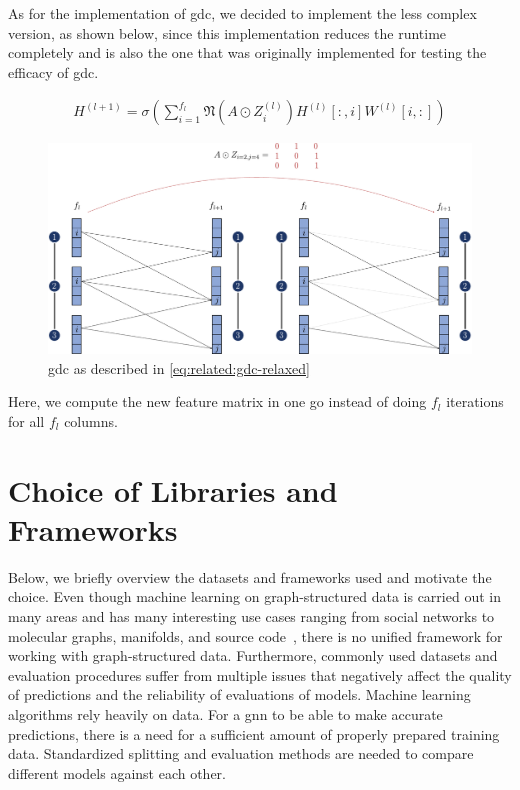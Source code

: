 As for the implementation of \ac{gdc}, we decided to implement the less complex version, as shown below, since this implementation reduces the runtime completely and is also the one that was originally implemented for testing the efficacy of \ac{gdc}.

\begin{align}
    H^{(l+1)} = \sigma(\sum_{i= 1}^{f_{l}}\mathfrak{N}(A \odot Z_{i}^{(l)})H^{(l)}[:,i] W^{(l)}[i,:]) \label{eq:relaxed}
\end{align}
\begin{figure}[ht]
    \centering
    \includegraphics[width= 0.90\linewidth]{gfx/implementation/GDC-eq4.pdf}
    \caption{\Ac{gdc} as described in \cref{eq:related:gdc-relaxed}}\label{fig:implementaion:GDC-eq4}
\end{figure}
Here, we compute the new feature matrix in one go instead of doing $f_{l}$ iterations for all $f_{l}$ columns.


\section{Choice of Libraries and Frameworks}
\label{sec:implement:frameworks}
Below, we briefly overview the datasets and frameworks used and motivate the choice.
Even though machine learning on graph-structured data is carried out in many areas and has many interesting use cases ranging from social networks to molecular graphs, manifolds, and source code~\cite{Hu2020},
there is no unified framework for working with graph-structured data.
Furthermore, commonly used datasets and evaluation procedures suffer from multiple issues that negatively affect the quality of predictions and the reliability of evaluations of models.
Machine learning algorithms rely heavily on data. For a \ac{gnn} to be able to make accurate predictions, there is a need for a sufficient amount of properly prepared training data. Standardized splitting and evaluation methods are needed to compare different models against each other.

